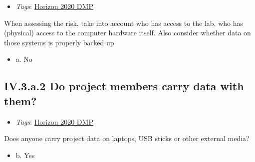 \documentclass[a4paper,12pt]{report}
\begin{document}
\label{10a10ffd-bfe1-4c6b-bbb6-3dfb1e63a5d5.614ab69d-55a6-4214-b384-00ba21ce92a1.b2f76c0a-847a-403c-9ed6-09cad10e625e.90324a7b-f3c9-4ed8-b301-edc9869cb7b3}


\begin{itemize}
  \item \textit{Tags}: \ul{Horizon 2020 DMP}
  \end{itemize}


\noindent
\begin{markdown}
When assessing the risk, take into account who has access to the lab, who has (physical) access to the computer hardware itself. Also consider whether data on those systems is properly backed up
\end{markdown}



\begin{itemize}
  \item[\CheckmarkBold] a. No
\end{itemize}




\subsection*{\protect\textcolor{colorSecId}{IV.3.a.2} Do project members carry data with them?}

\label{10a10ffd-bfe1-4c6b-bbb6-3dfb1e63a5d5.614ab69d-55a6-4214-b384-00ba21ce92a1.b2f76c0a-847a-403c-9ed6-09cad10e625e.abaf4a70-17d4-449c-9b95-5b3bcfed7e9b}


\begin{itemize}
  \item \textit{Tags}: \ul{Horizon 2020 DMP}
  \end{itemize}


\noindent
\begin{markdown}
Does anyone carry project data on laptops, USB sticks or other external media?
\end{markdown}



\begin{itemize}
  \item[\CheckmarkBold] b. Yes
\end{itemize}
\end{document}
